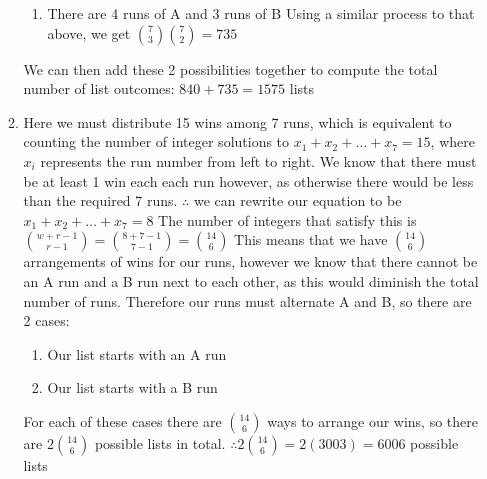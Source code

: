 \documentclass{article}
\begin{document}
\begin{enumerate}
\begin{enumerate}
\begin{enumerate}
				\item There are 4 runs of A and 3 runs of B
				\newline Using a similar process to that above, we get ${7\choose3}{7\choose2}=735$
			\end{enumerate}
			We can then add these 2 possibilities together to compute the total number of list outcomes: $840+735=1575$ lists
			
			\item Here we must distribute 15 wins among 7 runs, which is equivalent to counting the number of integer solutions to $x_1+x_2+\dots+x_7=15$, where $x_i$ represents the run number from left to right.
			\newline We know that there must be at least 1 win each each run however, as otherwise there would be less than the required 7 runs.
			\newline $\therefore$ we can rewrite our equation to be $x_1+x_2+\dots+x_7=8$
			\newline The number of integers that satisfy this is ${{w+r-1}\choose{r-1}}={{8+7-1}\choose{7-1}}={14\choose6}$
			\newline This means that we have ${14\choose6}$ arrangements of wins for our runs, however we know that there cannot be an A run and a B run next to each other, as this would diminish the total number of runs.
			\newline Therefore our runs must alternate A and B, so there are 2 cases:
			\begin{enumerate}
				\item Our list starts with an A run
				\item Our list starts with a B run
			\end{enumerate}
			For each of these cases there are ${14\choose6}$ ways to arrange our wins, so there are $2{14\choose6}$ possible lists in total.
			\newline $\therefore 2{14\choose6}=2(3003)=6006$ possible lists
		\end{enumerate}
	

\end{enumerate}
\end{document}
